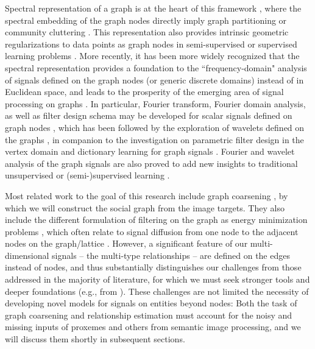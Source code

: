 Spectral representation of a graph is at the heart of this framework \cite{Ng:spectral,Luxburg,zhang2008multiway}, where the spectral embedding of the graph nodes directly imply graph partitioning or community cluttering \cite{PhysRevE,Boykov:segmentation}. This representation also provides intrinsic geometric regularizations to data points as graph nodes in semi-supervised or supervised learning problems \cite{Zhu2005,Smola2003,Zhou04}. More recently, it has been more widely recognized that the spectral representation provides a foundation to the ``frequency-domain" analysis of signals defined on the graph nodes (or generic discrete domains) instead of in Euclidean space, and leads to the prosperity of the emerging area of signal processing on graphs \cite{MouraSurvey,ShumanSurvey}. In particular, Fourier transform, Fourier domain analysis, as well as filter design schema may be developed for scalar signals defined on graph nodes \cite{hammond,Agaskar,Rabbat,shuman_ACHA_2013}, which has been followed by the exploration of wavelets defined on the graphs \cite{CK03,GavishNC10,narang2009lifting,RamEladCohen,NIPS2013_5046,Leonardi,ShumanFV13}, in companion to the investigation on parametric filter design in the vertex domain \cite{SandryhailaFilter,hammond} and dictionary learning for graph signals \cite{ThanouSF14,ZhangDF12}. Fourier and wavelet analysis of the graph signals are also proved to add new insights to traditional unsupervised \cite{Tremblay2014} or (semi-)supervised learning \cite{shuman2011semi,narang2013localized,Ekambaram,sandryhaila2013classification,ChenTSP2014}.

Most related work to the goal of this research include graph coarsening \cite{LafonPAMI,RonCoarsening}, by which we will construct the social graph from the image targets. They also include the different formulation of filtering on the graph as energy minimization problems \cite{Grady10}, which often relate to signal diffusion from one node to the adjacent nodes on the graph/lattice \cite{Geman_diffusion,Black_diffusion,Perona_diffusion,Bouman_diffusion,Zhangdiffusion}. However, a significant feature of our multi-dimensional signals -- the multi-type relationships -- are defined on the edges instead of nodes, and thus substantially distinguishes our challenges from those addressed in the majority of literature, for which we must seek stronger tools and deeper foundations (e.g., from \cite{Grady10}). These challenges are not limited the necessity of developing novel models for signals on entities beyond nodes: Both the task of graph coarsening and relationship estimation must account for the noisy and missing inputs of proxemes and others from semantic image processing, and we will discuss them shortly in subsequent sections.


